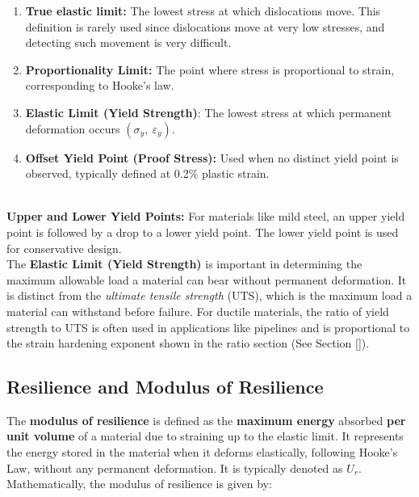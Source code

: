\documentclass{article}
\begin{document}
\begin{minipage}{0.6\textwidth}
 \begin{enumerate}
     \item \textbf{True elastic limit:} The lowest stress at which dislocations move. This definition is rarely used since dislocations move at very low stresses, and detecting such movement is very difficult.
     \item \textbf{Proportionality Limit:} The point where stress is proportional to strain, corresponding to Hooke's law.
     \item \textbf{Elastic Limit (Yield Strength)}: The lowest stress at which permanent deformation occurs \((\sigma_y,\ \varepsilon_y)\).
     \item \textbf{Offset Yield Point (Proof Stress):} Used when no distinct yield point is observed, typically defined at 0.2\% plastic strain.
 \end{enumerate}
  \end{minipage}\\[8pt]
\textbf{Upper and Lower Yield Points:} For materials like mild steel, an upper yield point is followed by a drop to a lower yield point. The lower yield point is used for conservative design.\\[8pt]
The \textbf{Elastic Limit (Yield Strength)} is important in determining the maximum allowable load a material can bear without permanent deformation. It is distinct from the \textit{ultimate tensile strength} (UTS), which is the maximum load a material can withstand before failure. For ductile materials, the ratio of yield strength to UTS is often used in applications like pipelines and is proportional to the strain hardening exponent shown in the ratio section (See Section \ref{}).
    
    \newpage    
    
    \subsection{Resilience and Modulus of Resilience}\label{mor}
    
The \textbf{modulus of resilience} is defined as the \textbf{maximum energy} absorbed \textbf{per unit volume} of a material due to straining up to the elastic limit. It represents the energy stored in the material when it deforms elastically, following Hooke's Law, without any permanent deformation. It is typically denoted as \( U_r \). Mathematically, the modulus of resilience is given by:
\end{document}
